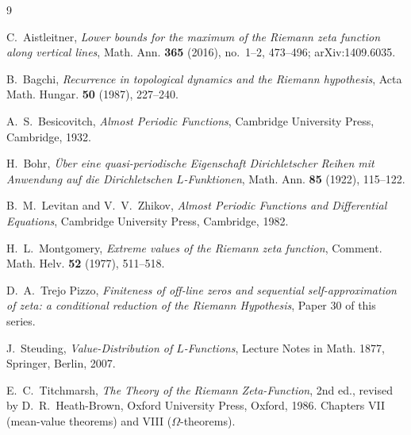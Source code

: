 \documentclass[11pt]{amsart}
\theoremstyle{definition}
\theoremstyle{remark}
\begin{document}
\begin{thebibliography}{9}

C.~Aistleitner, \emph{Lower bounds for the maximum of the Riemann zeta
function along vertical lines}, Math. Ann. \textbf{365} (2016),
no.~1--2, 473--496; arXiv:1409.6035.

B.~Bagchi, \emph{Recurrence in topological dynamics and the Riemann
hypothesis}, Acta Math. Hungar. \textbf{50} (1987), 227--240.

A.~S.~Besicovitch, \emph{Almost Periodic Functions}, Cambridge
University Press, Cambridge, 1932.

H.~Bohr, \emph{\"Uber eine quasi-periodische Eigenschaft Dirichletscher
Reihen mit Anwendung auf die Dirichletschen $L$-Funktionen},
Math. Ann. \textbf{85} (1922), 115--122.

B.~M.~Levitan and V.~V.~Zhikov, \emph{Almost Periodic Functions and
Differential Equations}, Cambridge University Press, Cambridge, 1982.

H.~L.~Montgomery, \emph{Extreme values of the Riemann zeta function},
Comment. Math. Helv. \textbf{52} (1977), 511--518.

D.~A.~Trejo Pizzo, \emph{Finiteness of off-line zeros and sequential
self-approximation of zeta: a conditional reduction of the Riemann
Hypothesis}, Paper 30 of this series.

J.~Steuding, \emph{Value-Distribution of $L$-Functions}, Lecture Notes
in Math. 1877, Springer, Berlin, 2007.

E.~C.~Titchmarsh, \emph{The Theory of the Riemann Zeta-Function},
2nd ed., revised by D.~R.~Heath-Brown, Oxford University Press,
Oxford, 1986. Chapters VII (mean-value theorems) and VIII
($\Omega$-theorems).

\end{thebibliography}
\end{document}
